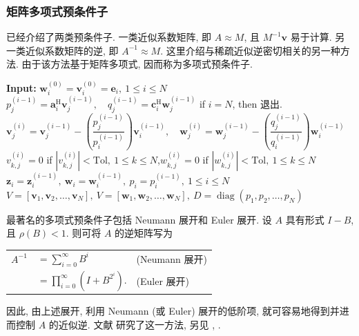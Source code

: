 \subsubsection{{矩阵多项式预条件子}}\label{subsec:polynomial-preconditioners}
{已经介绍了两类预条件子. 一类近似系数矩阵, 即 $A\approx M$, 且 $M^{-1}\bm v$ 易于计算. 另一类近似系数矩阵的逆, 即 $A^{-1}\approx M$. 这里介绍与稀疏近似逆密切相关的另一种方法. 由于该方法基于矩阵多项式, 因而称为多项式预条件子.}
\begin{algorithm}[H]\caption{{AINV 预条件子}}\label{alg:ainv}\begin{algorithmic}[1]
\Statex\textbf{Input:} $\bm w_i^{(0)}=\bm v_i^{(0)}=\bm e_i,\ 1\le i\le N$
\State $p_j^{(i-1)}=\bm a_i^{\mathrm H}\bm v_j^{(i-1)},\quad q_j^{(i-1)}=\bm c_i^{\mathrm H}\bm w_j^{(i-1)}$
\EndFor
\State if $i=N$, then {退出}.
\State $\bm v_j^{(i)}=\bm v_j^{(i-1)}-\left(\dfrac{p_j^{(i-1)}}{p_i^{(i-1)}}\right)\bm v_i^{(i-1)},\quad\bm w_j^{(i)}=\bm w_j^{(i-1)}-\left(\dfrac{q_j^{(i-1)}}{q_i^{(i-1)}}\right)\bm w_i^{(i-1)}$
\State $v_{k,j}^{(i)}=0$ if $|v_{k,j}^{(i)}|<\mathrm{Tol},\ 1\le k\le N$,\quad $w_{k,j}^{(i)}=0$ if $|w_{k,j}^{(i)}|<\mathrm{Tol},\ 1\le k\le N$
\EndFor\EndFor
\State $\bm z_i=\bm z_i^{(i-1)},\ \bm w_i=\bm w_i^{(i-1)},\ p_i=p_i^{(i-1)},\ 1\le i\le N$
\State $V=[\bm v_1,\bm v_2,\ldots,\bm v_N],\ V=[\bm w_1,\bm w_2,\ldots,\bm w_N],\ D=\operatorname{diag}(p_1,p_2,\ldots,p_N)$
\end{algorithmic}\end{algorithm}
{最著名的多项式预条件子包括 Neumann 展开和 Euler 展开. 设 $A$ 具有形式 $I-B$, 且 $\rho(B)<1$. 则可将 $A$ 的逆矩阵写为}
\begin{center}\begin{tabular}{r@{}ll}
$A^{-1}$&$=\displaystyle\sum_{i=0}^{\infty}B^i$&{(Neumann 展开)}\\[8pt]
&$=\displaystyle\prod_{i=0}^{\infty}(I+B^{2^i}).$&{(Euler 展开)}
\end{tabular}\end{center}
{因此, 由上述展开, 利用 Neumann (或 Euler) 展开的低阶项, 就可容易地得到并进而控制 $A$ 的近似逆. 文献  研究了这一方法, 另见 , .}
